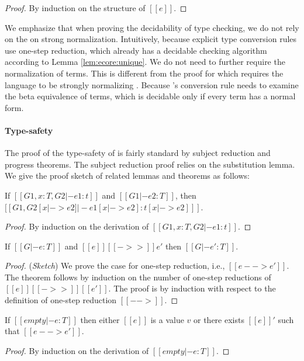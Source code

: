 \begin{proof}
	By induction on the structure of $[[e]]$.
\end{proof}

We emphasize that when proving the decidability of type checking, we
do not rely on the on strong normalization. Intuitively, because
explicit type conversion rules use one-step reduction, which already
has a decidable checking algorithm according to Lemma
\ref{lem:ecore:unique}. We do not need to further require the
normalization of terms. This is different from the proof for \cc which
requires the language to be strongly normalizing
\cite{pts:normalize}. Because \cc's conversion rule needs to examine
the beta equivalence of terms, which is decidable only if every term
has a normal form.

\paragraph{Type-safety}
The proof of the type-safety of \ecore is fairly standard by subject
reduction and progress theorems. The subject reduction proof relies on
the substitution lemma. We give the proof sketch of related lemmas and
theorems as follows:

\begin{lem}[Substitution]\label{lem:ecore:subst}
	If $[[G1, x:T, G2 |- e1:t]]$ and $[[G1 |- e2:T]]$, then $[[G1, G2 [x |-> e2]
|- e1[x |-> e2]  : t[x |-> e2] ]]$.
\end{lem}

\begin{proof}
    By induction on the derivation of $[[G1, x:T, G2 |- e1:t]]$.
\end{proof}

\begin{thm}\label{lem:ecore:reduct}
If $[[G |- e:T]]$ and $[[e]] [[->>]] e'$ then $[[G |- e':T]]$.
\end{thm}

\begin{proof}
    (\emph{Sketch}) We prove the case for one-step reduction, i.e., $[[e -->
e']]$. The theorem follows by induction on the number of one-step reductions
of $[[e]] [[->>]] [[e']]$.
    The proof is by induction with respect to the definition of one-step
reduction $[[-->]]$.
\end{proof}

\begin{thm}\label{lem:ecore:prog}
If $[[empty |- e:T]]$ then either $[[e]]$ is a value $v$ or there exists $[[e]]'$
such that $[[e --> e']]$.
\end{thm}

\begin{proof}
    By induction on the derivation of $[[empty |- e:T]]$.
\end{proof}
